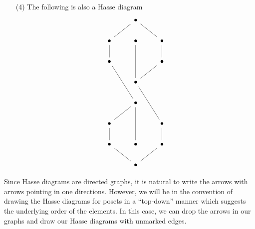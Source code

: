 \begin{example}
\begin{enumerate}
    \item[(4)] The following is also a Hasse diagram
      \[\begin{tikzcd}
  & \bullet \\
        \bullet & \bullet & \bullet \\
        \bullet && \bullet \\
                & \bullet \\
                & \bullet \\
        \bullet && \bullet \\
        \bullet & \bullet & \bullet \\
                & \bullet
                \arrow[no head, from=2-1, to=1-2]
                \arrow[no head, from=2-1, to=3-1]
                \arrow[no head, from=2-2, to=4-2]
                \arrow[no head, from=2-3, to=1-2]
                \arrow[no head, from=2-3, to=3-3]
                \arrow[no head, from=3-1, to=5-2]
                \arrow[no head, from=3-3, to=4-2]
                \arrow[no head, from=4-2, to=6-3]
                \arrow[no head, from=5-2, to=7-2]
                \arrow[no head, from=6-1, to=5-2]
                \arrow[no head, from=6-1, to=7-1]
                \arrow[no head, from=6-3, to=7-3]
                \arrow[no head, from=7-1, to=8-2]
                \arrow[no head, from=8-2, to=7-3]
      \end{tikzcd}\]
  \end{enumerate}
\end{example}

\begin{remark}
  Since Hasse diagrams are directed graphs, it is natural to write the
  arrows with arrows pointing in one directions. However, we will be
  in the convention of drawing the Hasse diagrams for posets in a
  ``top-down'' manner which suggests the underlying order of the
  elements. In this case, we can drop the arrows in our graphs and
  draw our Hasse diagrams with unmarked edges.
\end{remark}

